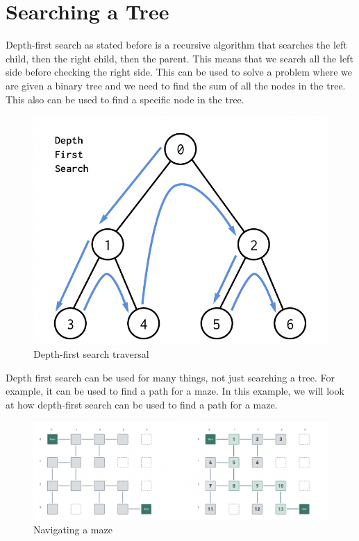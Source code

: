 \documentclass[12pt]{article}
\begin{document}
\section{Searching a Tree}
Depth-first search as stated before is a recursive algorithm that searches the left child, then the right child, then the parent.
This means that we search all the left side before checking the right side.
This can be used to solve a problem where we are given a binary tree and we need to find the sum of all the nodes in the tree.
This also can be used to find a specific node in the tree.
\begin{figure}[h!]
    \centering
    \includegraphics[scale=.5]{images/traversal.png}
    \caption{Depth-first search traversal}
\end{figure}
Depth first search can be used for many things, not just searching a tree.
For example, it can be used to find a path for a maze.
In this example, we will look at how depth-first search can be used to find a path for a maze.
\begin{figure}[h!]
    \centering
    \includegraphics[scale=.5]{images/maze.png}
    \caption{Navigating a maze}
\end{figure}
\end{document}
